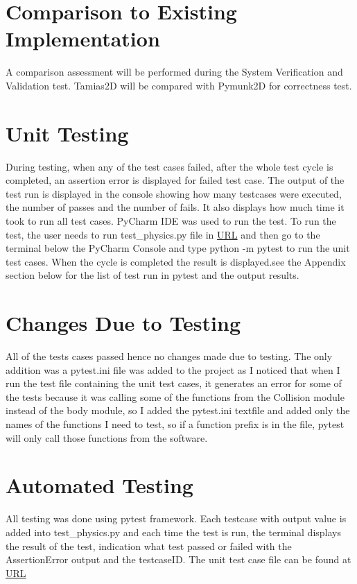 \documentclass[12pt, titlepage]{article}
\begin{document}
\section{Comparison to Existing Implementation}	
A comparison assessment will be performed during the System Verification and Validation test. Tamias2D will be compared with Pymunk2D for correctness test.


\section{Unit Testing}
During testing, when any of the test cases failed, after the whole test cycle is completed, an assertion error is displayed for failed test case. The output of the test run is displayed in the console showing how many testcases were executed, the number of passes and the number of fails. It also displays how much time it took to run all test cases. PyCharm IDE was used to run the test. To run the test, the user needs to run test\_physics.py file in \url{URL} and then go to the terminal below the PyCharm Console and type python -m pytest to run the unit test cases. When the cycle is completed the result is displayed.see the Appendix section below for the list of test run in pytest and the output results.
\section{Changes Due to Testing}
All of the tests cases passed hence no changes made due to testing. The only addition was a pytest.ini file was added to the project as I noticed that when I run the test file containing the unit test cases, it generates an error for some of the tests because it was calling some of the functions from the Collision module instead of the body module, so I added the pytest.ini textfile and added only the names of the functions I need to test, so if a function prefix is in the file, pytest will only call those functions from the software.
\section{Automated Testing}

All testing was done using pytest framework. Each testcase with output value is added into test\_physics.py and each time the test is run, the terminal displays the result of the test, indication what test passed or failed with the AssertionError output and the testcaseID. The unit test case file can be found at \url{URL}
	
\end{document}
